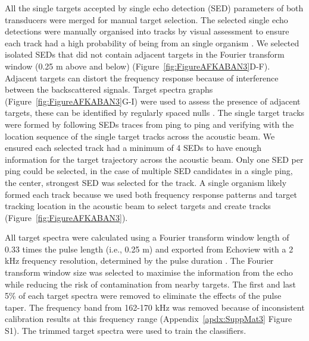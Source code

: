 {All the single targets accepted by single echo detection (SED) parameters of both transducers were merged for manual target selection. The selected single echo detections were manually organised into tracks by visual assessment to ensure each track had a high probability of being from an single organism \citep{Khodabandeloo2021}. We selected isolated SEDs that did not contain adjacent targets in the Fourier transform window (0.25 m above and below) (Figure~\ref{fig:FigureAFKABAN3}D-F). Adjacent targets can distort the frequency response because of interference between the backscattered signals. Target spectra graphs (Figure~\ref{fig:FigureAFKABAN3}G-I) were used to assess the presence of adjacent targets, these can be identified by regularly spaced nulls \citep{Stanton1996, Reeder2004, Khodabandeloo2021}. The single target tracks were formed by following SEDs traces from ping to ping and verifying with the location sequence of the single target tracks across the acoustic beam. We ensured each selected track had a minimum of 4 SEDs to have enough information for the target trajectory across the acoustic beam. Only one SED per ping could be selected, in the case of multiple SED candidates in a single ping, the center, strongest SED was selected for the track. A single organism likely formed each track because we used both frequency response patterns and target tracking location in the acoustic beam to select targets and create tracks (Figure~\ref{fig:FigureAFKABAN3}). \\


All target spectra were calculated using a Fourier transform window length of 0.33 times the pulse length (i.e., 0.25 m) and exported from Echoview with a 2 kHz frequency resolution, determined by the pulse duration \citep{Medwin1998, Khodabandeloo2021}. The Fourier transform window size was selected to maximise the information from the echo while reducing the risk of contamination from nearby targets.
The first and last 5\% of each target spectra were removed to eliminate the effects of the pulse taper. The frequency band from 162-170 kHz was removed because of inconsistent calibration results at this frequency range (Appendix~\ref{apdx:SuppMat3} Figure S1). The trimmed target spectra were used to train the classifiers.\\

}

